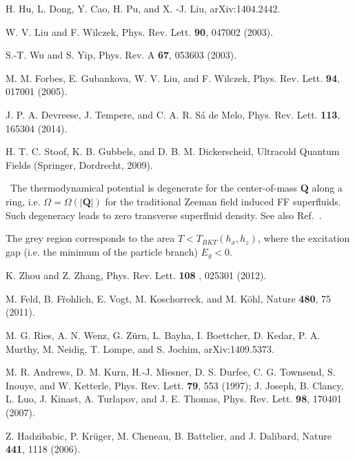\documentclass[prl,aps,twocolumn,showpacs, floatfix]{revtex4}
\begin{document}
\begin{thebibliography}{99}
 {H. Hu, L. Dong, Y. Cao, H. Pu, and X. -J. Liu,
arXiv:1404.2442.}

 {W. V. Liu and F. Wilczek, Phys. Rev. Lett. \textbf{%
90}, 047002 (2003).}

 {S.-T. Wu and S. Yip, Phys. Rev. A \textbf{67}, 053603
(2003).}

 {M. M. Forbes, E. Gubankova, W. V. Liu, and F.
Wilczek, Phys. Rev. Lett. \textbf{94}, 017001 (2005).}

 {J. P. A. Devreese, J. Tempere, and C. A. R. S\'a de
Melo, Phys. Rev. Lett. \textbf{113}, 165304 (2014).}

 {H. T. C. Stoof, K. B. Gubbels, and D. B. M.
Dickerscheid, Ultracold Quantum Fields (Springer, Dordrecht, 2009). }

 {\ The thermodynamical potential is degenerate for the
center-of-mass $\mathbf{Q}$ along a ring, i.e. $\Omega=\Omega(|\mathbf{Q}|)$
for the traditional Zeeman field induced FF superfluids. Such degeneracy
leads to zero transverse superfluid density. See also Ref.~\cite%
{Vishwanath2009PRL,Torma2014PRB}. }

 {The grey region corresponds to the area $%
T<T_{BKT}(h_x,h_z)$, where the excitation gap (i.e. the minimum of the
particle branch) $E_g<0$. }

 {K. Zhou and Z. Zhang, Phys. Rev. Lett. \textbf{108}%
, 025301 (2012).}

 {M. Feld, B. F\"rohlich, E. Vogt, M. Koschorreck,
and M. K\"ohl, Nature \textbf{480}, 75 (2011).}

 {M. G. Ries, A. N. Wenz, G. Z\"urn, L. Bayha, I.
Boettcher, D. Kedar, P. A. Murthy, M. Neidig, T. Lompe, and S. Jochim,
arXiv:1409.5373.}

 {M. R. Andrews, D. M. Kurn, H.-J. Miesner, D. S.
Durfee, C. G. Townsend, S. Inouye, and W. Ketterle, Phys. Rev. Lett. \textbf{%
79}, 553 (1997); J. Joseph, B. Clancy, L. Luo, J. Kinast, A. Turlapov, and
J. E. Thomas, Phys. Rev. Lett. \textbf{98}, 170401 (2007).}

 {Z. Hadzibabic, P. Kr\"uger, M. Cheneau, B.
Battelier, and J. Dalibard, Nature \textbf{441}, 1118 (2006).}
\end{thebibliography}
\end{document}
